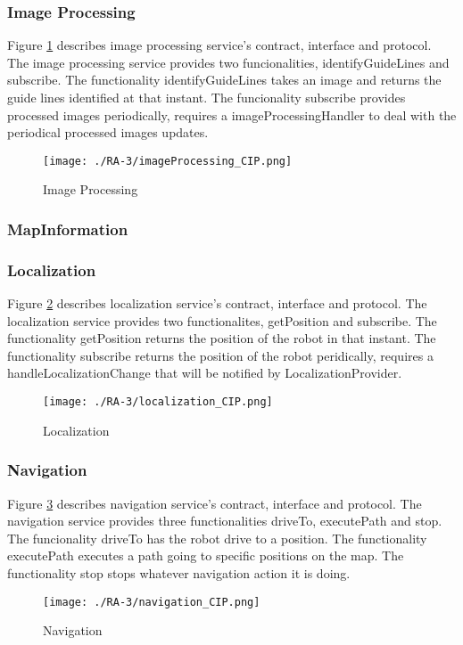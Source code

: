 \subsubsection{Image Processing} %
Figure \ref{fig:imageprocessing_cip} describes image processing service's contract, interface and protocol. The image processing service provides two funcionalities, identifyGuideLines and subscribe. The functionality identifyGuideLines takes an image and returns the guide lines identified at that instant. The funcionality subscribe provides processed images periodically, requires a imageProcessingHandler to deal with the periodical processed images updates. 
\begin{figure}[ht!]
 \centering
 \texttt{[image: ./RA-3/imageProcessing\_CIP.png]}
 \caption{Image Processing}
 \label{fig:imageprocessing_cip}
\end{figure}

\subsubsection{MapInformation} %

\subsubsection{Localization} %
Figure \ref{fig:localization_cip} describes localization service's contract, interface and protocol. The localization service provides two functionalites, getPosition and subscribe. The functionality getPosition returns the position of the robot in that instant. The functionality subscribe returns the position of the robot peridically, requires a handleLocalizationChange that will be notified by LocalizationProvider.
\begin{figure}[ht!]
 \centering
 \texttt{[image: ./RA-3/localization\_CIP.png]}
 \caption{Localization}
 \label{fig:localization_cip}
\end{figure}

\subsubsection{Navigation} %
Figure \ref{fig:navigation_cip} describes navigation service's contract, interface and protocol. The navigation service provides three functionalities driveTo, executePath and stop. The funcionality driveTo has the robot drive to a position. The functionality executePath executes a path going to specific positions on the map. The functionality stop stops whatever navigation action it is doing.
\begin{figure}[ht!]
 \centering
 \texttt{[image: ./RA-3/navigation\_CIP.png]}
 \caption{Navigation}
 \label{fig:navigation_cip}
\end{figure}

